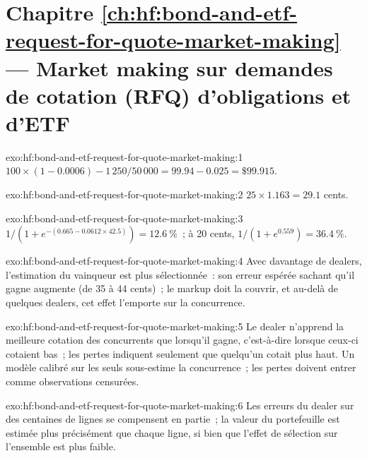 \section*{Chapitre \ref{ch:hf:bond-and-etf-request-for-quote-market-making} --- Market making sur demandes de cotation (RFQ) d'obligations et d'ETF}

\begin{solution}{exo:hf:bond-and-etf-request-for-quote-market-making:1}
$100\times(1-0.0006)-1\,250/50\,000=99.94-0.025=\$99.915$.
\end{solution}

\begin{solution}{exo:hf:bond-and-etf-request-for-quote-market-making:2}
$25\times1.163=29.1$ cents.
\end{solution}

\begin{solution}{exo:hf:bond-and-etf-request-for-quote-market-making:3}
$1/(1+e^{-(0.665-0.0612\times42.5)})=12.6~\%$~; à 20 cents, $1/(1+e^{0.559})=36.4~\%$.
\end{solution}

\begin{solution}{exo:hf:bond-and-etf-request-for-quote-market-making:4}
Avec davantage de dealers, l'estimation du vainqueur est plus sélectionnée~: son erreur espérée sachant qu'il gagne augmente (de 35 à 44 cents)~; le markup doit la couvrir, et
au-delà de quelques dealers, cet effet l'emporte sur la concurrence.
\end{solution}

\begin{solution}{exo:hf:bond-and-etf-request-for-quote-market-making:5}
Le dealer n'apprend la meilleure cotation des concurrents que lorsqu'il gagne, c'est-à-dire lorsque ceux-ci cotaient bas~; les pertes indiquent seulement que quelqu'un cotait plus haut.
Un modèle calibré sur les seuls  sous-estime la concurrence~; les pertes doivent entrer comme observations censurées.
\end{solution}

\begin{solution}{exo:hf:bond-and-etf-request-for-quote-market-making:6}
Les erreurs du dealer sur des centaines de lignes se compensent en partie~; la valeur du portefeuille est estimée plus précisément que chaque ligne, si bien que l'effet de sélection sur
l'ensemble est plus faible.
\end{solution}

